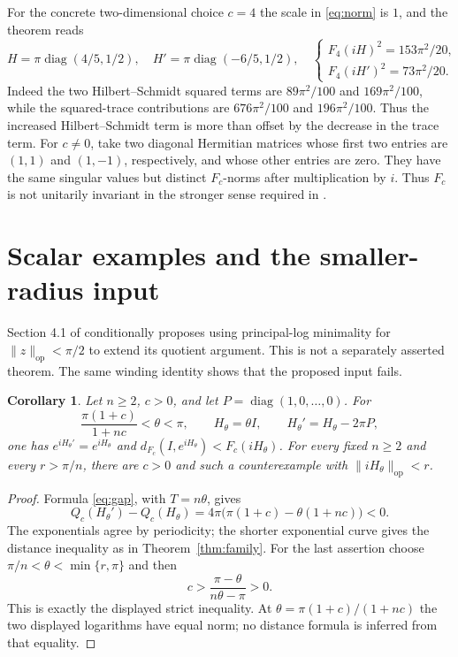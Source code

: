 \documentclass[11pt]{article}
\newcommand{\diag}{\operatorname{diag}}
\newcommand{\op}{\mathrm{op}}
\newtheorem{corollary}[theorem]{Corollary}
\begin{document}
For the concrete two-dimensional choice $c=4$ the scale in
\eqref{eq:norm} is $1$, and the theorem reads
\begin{equation}\label{eq:main-example}
 H=\pi\diag(4/5,1/2),\quad H'=\pi\diag(-6/5,1/2),\quad
 \begin{cases}
 F_4(iH)^2=153\pi^2/20,\\
 F_4(iH')^2=73\pi^2/20.
 \end{cases}
\end{equation}
Indeed the two Hilbert--Schmidt squared terms are $89\pi^2/100$
and $169\pi^2/100$, while the squared-trace contributions are
$676\pi^2/100$ and $196\pi^2/100$.
Thus the increased Hilbert--Schmidt term is more than offset by the
decrease in the trace term. For $c\ne0$, take two diagonal Hermitian
matrices whose first two entries are $(1,1)$ and $(1,-1)$, respectively,
and whose other entries are zero. They have the same singular values but
distinct $F_c$-norms after multiplication by $i$.
Thus $F_c$ is not unitarily invariant in the stronger sense
required in \cite{ALV}.

\section{Scalar examples and the smaller-radius input}
Section 4.1 of \cite{Larotonda} conditionally proposes using
principal-log minimality for $\|z\|_{\op}<\pi/2$ to extend its quotient
argument. This is not a separately asserted theorem.
The same winding identity shows that the proposed input fails.
\begin{corollary}\label{cor:scalar}
Let $n\geq2$, $c>0$, and let $P=\diag(1,0,\ldots,0)$.
For
\[
 \frac{\pi(1+c)}{1+nc}<\theta<\pi,\qquad
 H_\theta=\theta I,\qquad H_\theta'=H_\theta-2\pi P,
\]
one has $e^{iH_\theta'}=e^{iH_\theta}$ and
$d_{F_c}(I,e^{iH_\theta})<F_c(iH_\theta)$.
For every fixed $n\geq2$ and every $r>\pi/n$, there are $c>0$
and such a counterexample with $\|iH_\theta\|_{\op}<r$.
\end{corollary}
\begin{proof}
Formula \eqref{eq:gap}, with $T=n\theta$, gives
\[
 Q_c(H_\theta')-Q_c(H_\theta)
 =4\pi\big(\pi(1+c)-\theta(1+nc)\big)<0.
\]
The exponentials agree by periodicity; the shorter exponential curve
gives the distance inequality as in Theorem~\ref{thm:family}.
For the last assertion choose $\pi/n<\theta<\min\{r,\pi\}$ and then
\[
 c>\frac{\pi-\theta}{n\theta-\pi}>0.
\]
This is exactly the displayed strict inequality. At
$\theta=\pi(1+c)/(1+nc)$ the two displayed logarithms have equal norm;
no distance formula is inferred from that equality.
\end{proof}
\end{document}
